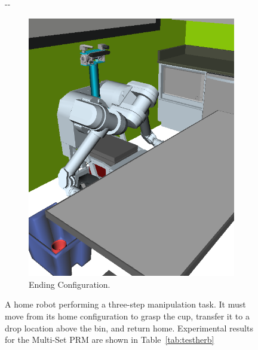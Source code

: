 \documentclass{report}
\newlength{\offsetpage}
\newenvironment{widepage}
   {\begin{adjustwidth}{-\offsetpage}{-\offsetpage}%
    \addtolength{\textwidth}{2\offsetpage}}%
{\end{adjustwidth}}
\begin{document}
\begin{figure}
\begin{widepage}
\begin{subfigure}[t]{0.185\linewidth}
\includegraphics[width=\columnwidth]{figs/testherb-e.png}
\caption{Ending Configuration.}
\end{subfigure}

\caption{
  A home robot performing a three-step manipulation task.
  It must move from its home configuration
  to grasp the cup,
  transfer it to a drop location above the bin,
  and return home.
  Experimental results for the Multi-Set PRM
  are shown in Table~\ref{tab:testherb}}
\label{fig:testherb-problem}
\end{widepage}
\end{figure}
\end{document}

